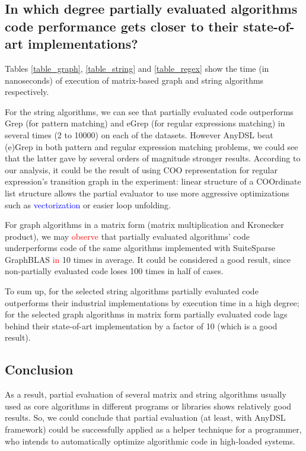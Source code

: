 \documentclass[conference]{IEEEtran}
\begin{document}
\begin{figure}
	\centering
\end{figure}

\subsection{In which degree partially evaluated algorithms code performance gets closer to their state-of-art implementations?}

Tables \ref{table_graph}, \ref{table_string} and \ref{table_regex} show the time (in nanoseconds) of execution of matrix-based graph and string algorithms respectively. 

For the string algorithms, we can see that partially evaluated code outperforms Grep (for pattern matching) and eGrep (for regular expressions matching) in several times (2 to 10000) on each of the datasets. However AnyDSL beat (e)Grep in both pattern and regular expression matching problems, we could see that the latter gave by several orders of magnitude stronger results. According to our analysis, it could be the result of using COO representation for regular expression's transition graph in the experiment: linear structure of a COOrdinate list structure allows the partial evaluator to use more aggressive optimizations such as \textcolor{blue}{vectorization} or easier loop unfolding.

For graph algorithms in a matrix form (matrix multiplication and Kronecker product), we may \textcolor{red}{observe} that partially evaluated algorithms' code underperforms code of the same algorithms implemented with SuiteSparse GraphBLAS \textcolor{red}{in} 10 times in average. It could be considered a good result, since non-partially evaluated code loses 100 times in half of cases.

To sum up, for the selected string algorithms partially evaluated code outperforms their industrial implementations by execution time in a high degree; for the selected graph algorithms in matrix form partially evaluated code lags behind their state-of-art implementation by a factor of 10 (which is a good result).

\subsection{Conclusion}
As a result, partial evaluation of several matrix and string algorithms usually used as core algorithms in different programs or libraries shows relatively good results. So, we could conclude that partial evaluation (at least, with AnyDSL framework) could be successfully applied as a helper technique for a programmer, who intends to automatically optimize algorithmic code in high-loaded systems.
\end{document}
